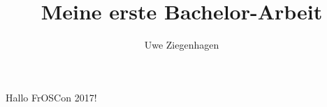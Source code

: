 \documentclass[12pt,ngerman]{scrartcl}
\author{Uwe Ziegenhagen}
\title{Meine erste Bachelor-Arbeit}
\begin{document}
\maketitle


Hallo FrOSCon 2017!
\end{document}
